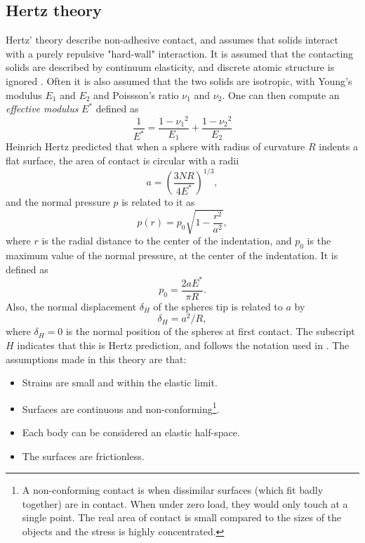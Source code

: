 \documentclass[twoside,english]{uiofysmaster}
\newcommand\lr[1]{\left(#1\right)}
\begin{document}
\subsection{Hertz theory} \label{sec:hertzTheory}
Hertz' theory describe non-adhesive contact, and assumes that solids interact with a purely repulsive "hard-wall" interaction.
It is assumed that the contacting solids are described by continuum elasticity, and discrete atomic structure is ignored \cite{RobbinsSingleAsperity}. 
Often it is also assumed that the two solids are isotropic, with Young's modulus $E_1$ and $E_2$ and Poissson's ratio $\nu_1$ and $\nu_2$. 
One can then compute an \textit{effective modulus} $E^*$ defined as
\begin{equation}
\frac{1}{E^*} = \frac{1-{\nu_1}^2}{E_1} + \frac{1-{\nu_2}^2}{E_2} \label{eq:effectiveModulus}
\end{equation}
Heinrich Hertz predicted that when a sphere with radius of curvature $R$ indents a flat surface, the area of contact is circular with a radii \cite{Johnson1985}
\begin{equation}
a = \lr{\frac{3NR}{4E^*}}^{1/3}, \label{eq:HertzRadii}
\end{equation}
and the normal pressure $p$ is related to it as
\begin{equation}
p(r) = p_0\sqrt{1-\frac{r^2}{a^2}}, \label{eq:HertzPressure}
\end{equation}
where $r$ is the radial distance to the center of the indentation, and
$p_0$ is the maximum value of the normal pressure, at the center of the indentation. It is defined as
\begin{equation}
	p_0 = \frac{2aE^*}{\pi R}. \label{eq:HertzMaxPressure}
\end{equation}
Also, the normal displacement $\delta_H$ of the spheres tip is related to $a$ by
\begin{equation}
\delta_H = a^2/R,
\end{equation}
where $\delta_H=0$ is the normal position of the spheres at first contact.
The subscript $H$ indicates that this is Hertz prediction, and follows the notation used in \cite{Johnson1985}.
The assumptions made in this theory are that: 
\begin{itemize}
	\item Strains are small and within the elastic limit.
	\item Surfaces are continuous and non-conforming\footnote{
		A non-conforming contact is when dissimilar surfaces (which fit badly together) are in contact. When under zero load, they would only touch at a single point. 
		The real area of contact is small compared to the sizes of the objects and the stress is highly concentrated.}.
	\item Each body can be considered an elastic half-space.
	\item The surfaces are frictionless.
\end{itemize}
\end{document}

